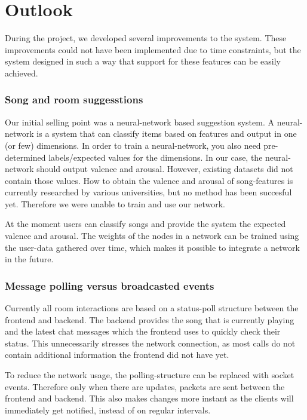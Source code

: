 \chapter{Outlook}
During the project, we developed several improvements to the system.
These improvements could not have been implemented due to time constraints, but the system designed in such a way that support for these features can be easily achieved.

\label{outlook-neural}
\subsection{Song and room suggesstions}
Our initial selling point was a neural-network based suggestion system.
A neural-network is a system that can classify items based on features and output in one (or few) dimensions.
In order to train a neural-network, you also need pre-determined labels/expected values for the dimensions.
In our case, the neural-network should output \gls{valence} and \gls{arousal}.
However, existing datasets did not contain those values.
How to obtain the valence and arousal of song-features is currently researched by various universities, but no method has been succesful yet.
Therefore we were unable to train and use our network.

At the moment users can classify songs and provide the system the expected valence and arousal.
The weights of the nodes in a network can be trained using the user-data gathered over time, which makes it possible to integrate a network in the future.

\subsection{Message polling versus broadcasted events}
Currently all room interactions are based on a status-poll structure between the frontend and backend.
The backend provides the song that is currently playing and the latest chat messages which the frontend uses to quickly check their status.
This unnecessarily stresses the network connection, as most calls do not contain additional information the frontend did not have yet.

To reduce the network usage, the polling-structure can be replaced with socket events.
Therefore only when there are updates, packets are sent between the frontend and backend.
This also makes changes more instant as the clients will immediately get notified, instead of on regular intervals.

